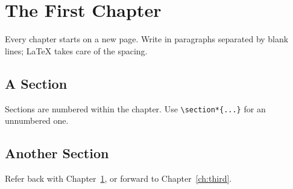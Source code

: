 \chapter{The First Chapter}
\label{ch:first}

Every chapter starts on a new page. Write in paragraphs separated by blank
lines; LaTeX takes care of the spacing.

\section{A Section}
Sections are numbered within the chapter. Use \verb|\section*{...}| for an
unnumbered one.

\section{Another Section}
Refer back with Chapter~\ref{ch:first}, or forward to Chapter~\ref{ch:third}.
